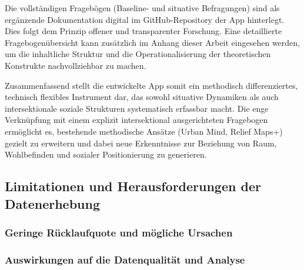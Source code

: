 Die vollständigen Fragebögen (Baseline- und situative Befragungen) sind als ergänzende Dokumentation digital im GitHub-Repository der App hinterlegt. Dies folgt dem Prinzip offener und transparenter Forschung. Eine detaillierte Fragebogenübersicht kann zusätzlich im Anhang dieser Arbeit eingesehen werden, um die inhaltliche Struktur und die Operationalisierung der theoretischen Konstrukte nachvollziehbar zu machen.

Zusammenfassend stellt die entwickelte App somit ein methodisch differenziertes, technisch flexibles Instrument dar, das sowohl situative Dynamiken als auch intersektionale soziale Strukturen systematisch erfassbar macht. Die enge Verknüpfung mit einem explizit intersektional ausgerichteten Fragebogen ermöglicht es, bestehende methodische Ansätze (Urban Mind, Relief Maps+) gezielt zu erweitern und dabei neue Erkenntnisse zur Beziehung von Raum, Wohlbefinden und sozialer Positionierung zu generieren.


\subsection{Limitationen und Herausforderungen der Datenerhebung}

\subsubsection{Geringe Rücklaufquote und mögliche Ursachen}

\subsubsection{Auswirkungen auf die Datenqualität und Analyse}
